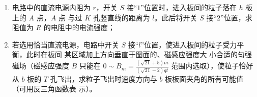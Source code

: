 \begin{enumerate}
\begin{enumerate}
\item 
电路中的直流电源内阻为 $ r $，开关 $ S $ 接“$ 1 $”位置时，进入板间的粒子落在 $ h $ 板上的 $ A $ 点，$ A $ 点
与过 $ K $ 孔竖直线的距离为 $ l $。此后将开关 $ S $ 接“$ 2 $”位置，求阻值为 $ R $ 的电阻中的电流强度；

\item 
若选用恰当直流电源，电路中开关 $ S $ 接“$ l $”位置，使进入板间的粒子受力平衡，此时在板间
某区域加上方向垂直于图面的、磁感应强度大
小合适的匀强磁场（磁感应强度 $ B $ 只能在 $ 0 \sim B_{m}=\frac{(\sqrt{21}+5) m}{(\sqrt{21}-2) q t}$ 范围内选取），使粒子恰好从
$ b $ 板的 $ T $ 孔飞出，求粒子飞出时速度方向与 $ b $ 板板面夹角的所有可能值（可用反三角函数表
示）。

	
\end{enumerate}
\begin{figure}[h!]
	\flushright
	
\end{figure}
















\end{enumerate}

